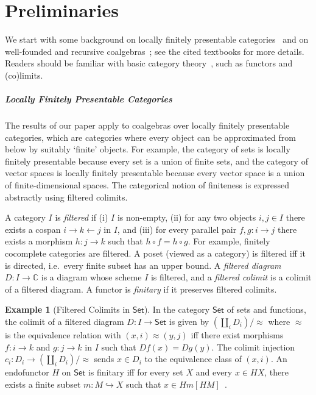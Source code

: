 \documentclass[10pt,a4paper]{article}
\theoremstyle{definition}
\newtheorem{example}[theorem]{Example}
\theoremstyle{remark}
\numberwithin{equation}{section}
\providecommand{\catname}{\mathsf}
\def\Set{\catname{Set}}
\newcommand{\lfplong}{locally finitely presentable\xspace}
\providecommand{\C}{}
\renewcommand{\C}{{\mathbb{C}}}
\newcommand{\subto}{\hookrightarrow}
\theoremstyle{plain}
\theoremstyle{definition}
\begin{document}
\section{Preliminaries}\label{sec:prelim}
We start with some background on \lfplong categories~\cite{adamek_rosicky_1994} and on well-founded and recursive coalgebras~\cite{amm25,taylor99}; see the cited textbooks for more details. Readers should be familiar with basic category theory~\cite{mac2013categories}, such as functors and (co)limits.



\subparagraph*{Locally Finitely Presentable Categories}
The results of our paper apply to coalgebras over \lfplong categories, which are categories where every object can be approximated from below by suitably `finite' objects. For example, the category of sets is \lfplong because every set is a union of finite sets, and the category of vector spaces is \lfplong because every vector space is a  union of finite-dimensional spaces. The categorical notion of finiteness is expressed abstractly using filtered colimits.

A category $I$ is \emph{filtered} if (i) $I$ is non-empty, (ii) for any two objects $i,j\in I$ there exists a cospan $i\to k \leftarrow j$ in $I$, and (iii) for every parallel pair $f,g\colon i\to j$ there exists a morphism $h\colon j\to k$ such that $h\circ f = h\circ g$. For example, finitely cocomplete categories are filtered. A poset (viewed as a category) is filtered iff it is directed, i.e.\ every finite subset has an upper bound. A \emph{filtered diagram} $D\colon I\to \C$ is a diagram whose scheme $I$ is filtered, and a \emph{filtered colimit} is a colimit of a filtered diagram. A functor is \emph{finitary} if it preserves filtered colimits.

\begin{example}[Filtered Colimits in $\Set$]\label{ex:filtered-set}
In the category $\Set$ of sets and functions, the colimit of a filtered diagram $D\colon I\to \Set$ is given by $(\coprod_i D_i)/{\approx}$ where $\approx$ is the equivalence relation with  $(x,i)\approx (y,j)$ iff there exist morphisms $f\colon i\to k$ and $g\colon j\to k$ in $I$ such that $Df(x)=Dg(y)$. The colimit injection $c_i\colon D_i\to (\coprod_i D_i)/{\approx}$ sends $x\in D_i$ to the equivalence class of $(x,i)$. An endofunctor $H$ on $\Set$ is finitary iff for every set $X$ and every $x\in HX$, there exists a finite subset $m\colon M\subto X$ such that $x\in Hm[HM]$~\cite[Rem.\ 3.14]{amsw19}.
\end{example}
\end{document}
